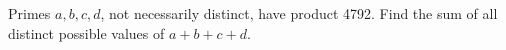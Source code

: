 Primes $a,b,c,d$, not necessarily distinct, have product 4792. Find the sum of all distinct possible values of $a+b+c+d$.
